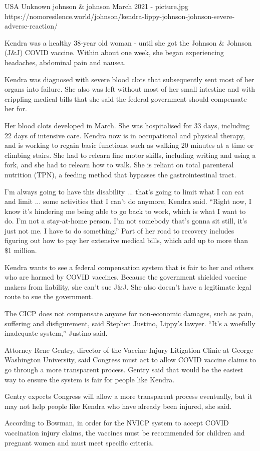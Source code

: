{USA}
{Unknown}
{johnson \& johnson}
{March 2021}
{-}
{picture.jpg}
{https://nomoresilence.world/johnson/kendra-lippy-johnson-johnson-severe-adverse-reaction/}
{

Kendra was a healthy 38-year old woman - until she got the Johnson \& Johnson
(J\&J) COVID vaccine. Within about one week, she began experiencing headaches,
abdominal pain and nausea.

Kendra was diagnosed with severe blood clots that subsequently sent most of her
organs into failure. She also was left without most of her small intestine  and
with crippling medical bills that she said the federal government should
compensate her for.

Her blood clots developed in March. She was hospitalised for 33 days, including
22 days of intensive care.  Kendra now is in occupational and physical therapy,
and is working to regain basic functions, such as walking 20 minutes at a time
or climbing stairs. She had to relearn fine motor skills, including writing and
using a fork, and she had to relearn how to walk. She is reliant on total
parenteral nutrition (TPN), a feeding method that bypasses the gastrointestinal
tract.

I'm always going to have this disability ... that's going to limit what I can eat
and limit ... some activities that I can't do anymore, Kendra said. ``Right now, I
know it's hindering me being able to go back to work, which is what I want to
do. I'm not a stay-at-home person. I'm not somebody that's gonna sit still, it's
just not me. I have to do something.''  Part of her road to recovery includes
figuring out how to pay her extensive medical bills, which add up to more than
\$1 million.

Kendra wants to see a federal compensation system that is fair to her and others
who are harmed by COVID vaccines. Because the government shielded vaccine makers
from liability, she can't sue J\&J. She also doesn't have a legitimate legal
route to sue the government.

The CICP does not compensate anyone for non-economic damages, such as pain,
suffering and disfigurement, said Stephen Justino, Lippy's lawyer. ``It's a
woefully inadequate system,'' Justino said.

Attorney Rene Gentry, director of the Vaccine Injury Litigation Clinic at
George Washington University, said Congress must act to allow COVID vaccine
claims to go through a more transparent process. Gentry said that would be the
easiest way to ensure the system is fair for people like Kendra.

Gentry expects Congress will allow a more transparent process eventually, but it
may not help people like Kendra who have already been injured, she said.

According to Bowman, in order for the NVICP system to accept COVID vaccination
injury claims, the vaccines must be recommended for children and pregnant women
and must meet specific criteria.

}

